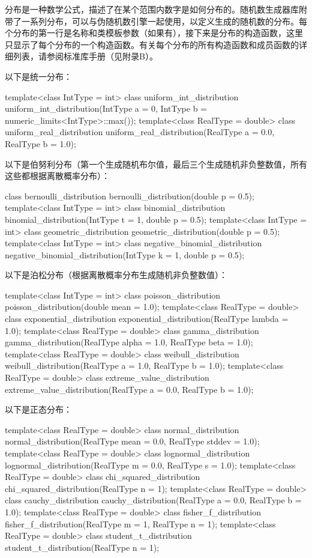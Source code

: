 分布是一种数学公式，描述了在某个范围内数字是如何分布的。随机数生成器库附带了一系列分布，可以与伪随机数引擎一起使用，以定义生成的随机数的分布。每个分布的第一行是名称和类模板参数（如果有），接下来是分布的构造函数，这里只显示了每个分布的一个构造函数。有关每个分布的所有构造函数和成员函数的详细列表，请参阅标准库手册（见附录B）。

以下是统一分布：

\begin{cpp}
template<class IntType = int> class uniform_int_distribution
    uniform_int_distribution(IntType a = 0,
                             IntType b = numeric_limits<IntType>::max());
template<class RealType = double> class uniform_real_distribution
    uniform_real_distribution(RealType a = 0.0, RealType b = 1.0);
\end{cpp}

以下是伯努利分布（第一个生成随机布尔值，最后三个生成随机非负整数值，所有这些都根据离散概率分布）：

\begin{cpp}
class bernoulli_distribution
    bernoulli_distribution(double p = 0.5);
template<class IntType = int> class binomial_distribution
    binomial_distribution(IntType t = 1, double p = 0.5);
template<class IntType = int> class geometric_distribution
    geometric_distribution(double p = 0.5);
template<class IntType = int> class negative_binomial_distribution
    negative_binomial_distribution(IntType k = 1, double p = 0.5);
\end{cpp}

以下是泊松分布（根据离散概率分布生成随机非负整数值）：

\begin{cpp}
template<class IntType = int> class poisson_distribution
    poisson_distribution(double mean = 1.0);
template<class RealType = double> class exponential_distribution
    exponential_distribution(RealType lambda = 1.0);
template<class RealType = double> class gamma_distribution
    gamma_distribution(RealType alpha = 1.0, RealType beta = 1.0);
template<class RealType = double> class weibull_distribution
    weibull_distribution(RealType a = 1.0, RealType b = 1.0);
template<class RealType = double> class extreme_value_distribution
    extreme_value_distribution(RealType a = 0.0, RealType b = 1.0);
\end{cpp}

以下是正态分布：

\begin{cpp}
template<class RealType = double> class normal_distribution
    normal_distribution(RealType mean = 0.0, RealType stddev = 1.0);
template<class RealType = double> class lognormal_distribution
    lognormal_distribution(RealType m = 0.0, RealType s = 1.0);
template<class RealType = double> class chi_squared_distribution
    chi_squared_distribution(RealType n = 1);
template<class RealType = double> class cauchy_distribution
    cauchy_distribution(RealType a = 0.0, RealType b = 1.0);
template<class RealType = double> class fisher_f_distribution
    fisher_f_distribution(RealType m = 1, RealType n = 1);
template<class RealType = double> class student_t_distribution
    student_t_distribution(RealType n = 1);
\end{cpp}

